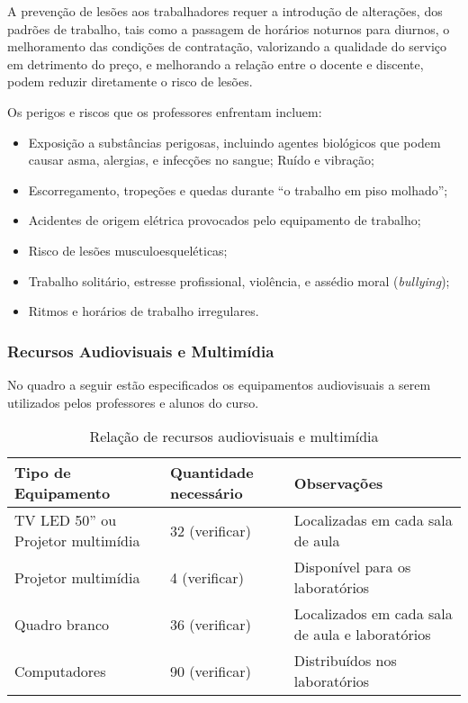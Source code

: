 A prevenção de lesões aos trabalhadores requer a introdução de alterações, dos padrões de trabalho, tais como a passagem de horários noturnos para diurnos, o melhoramento das condições de contratação, valorizando a qualidade do serviço em detrimento do preço, e melhorando a relação entre o docente e discente, podem reduzir diretamente o risco de les\~oes.

Os perigos e riscos que os professores enfrentam incluem:

\begin{itemize}
\item Exposição a substâncias perigosas, incluindo agentes biológicos que podem causar asma, alergias, e infecções no sangue;
Ruído e vibração;
\item Escorregamento, tropeções e quedas durante ``o trabalho em piso molhado'';
\item Acidentes de origem elétrica provocados pelo equipamento de trabalho;
\item Risco de lesões musculoesqueléticas;
\item Trabalho solitário, estresse profissional, violência, e assédio moral (\textit{bullying});
\item Ritmos e horários de trabalho irregulares.
\end{itemize}

\subsubsection{Recursos Audiovisuais e Multim\'idia}

No quadro a seguir estão especificados os equipamentos audiovisuais a serem utilizados pelos professores e alunos do curso.

\begin{table}[h]
\caption{Rela\c{c}\~ao de recursos audiovisuais e multim\'idia}
\begin{center}
\begin{tabular}{|p{4.5cm}|p{2.5cm}|p{4.5cm}|}
\hline
Tipo de Equipamento & Quantidade necess\'ario & Observa\c{c}\~oes\\
\hline 
\hline
TV LED 50'' ou Projetor multim\'idia & 32 (verificar) &  Localizadas em cada sala de aula\\
\hline
Projetor multim\'idia &  4 (verificar) & Dispon\'ivel para os laborat\'orios \\
\hline
Quadro branco & 36 (verificar) & Localizados em cada sala de aula e laborat\'orios \\
\hline
Computadores & 90 (verificar) & Distribu\'idos nos laborat\'orios \\
\hline
\end{tabular} 
\end{center}
\label{tab:pl}
\end{table}

